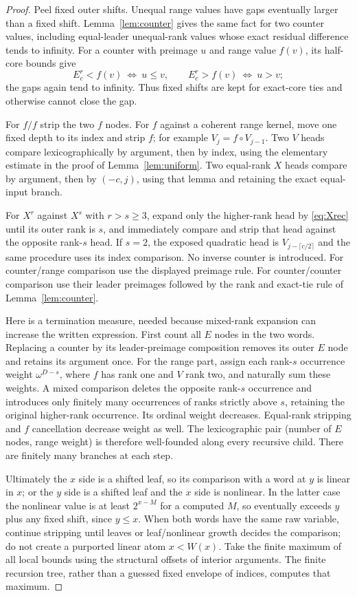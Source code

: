 \documentclass[11pt]{article}
\begin{document}
\begin{proof}
Peel fixed outer shifts. Unequal range values have gaps eventually larger
than a fixed shift. Lemma~\ref{lem:counter} gives the same fact for two
counter values, including equal-leader unequal-rank values whose exact
residual difference tends to infinity. For a counter with preimage $u$
and range value $f(v)$, its half-core bounds give
\[
 E^r_c<f(v)\ \Longleftrightarrow\ u\le v,
 \qquad E^r_c>f(v)\ \Longleftrightarrow\ u>v;
\]
the gaps again tend to infinity. Thus fixed shifts are kept for exact-core
ties and otherwise cannot close the gap.

For $f/f$ strip the two $f$ nodes. For $f$ against a coherent range
kernel, move one fixed depth to its index and strip $f$; for example
$V_j=f\circ V_{j-1}$. Two $V$ heads compare lexicographically by argument,
then by index, using the elementary estimate in the proof of
Lemma~\ref{lem:uniform}. Two equal-rank $X$ heads compare by argument,
then by $(-c,j)$, using that lemma and retaining the exact equal-input
branch.

For $X^r$ against $X^s$ with $r>s\ge3$, expand only the higher-rank head
by \eqref{eq:Xrec} until its outer rank is $s$, and immediately compare
and strip that head against the opposite rank-$s$ head. If $s=2$,
the exposed quadratic head is $V_{j-\lceil c/2\rceil}$ and the same
procedure uses its index comparison. No inverse counter is introduced.
For counter/range comparison use the displayed preimage rule. For
counter/counter comparison use their leader preimages followed by the
rank and exact-tie rule of Lemma~\ref{lem:counter}.

Here is a termination measure, needed because mixed-rank expansion can
increase the written expression. First count all $E$ nodes in the two
words. Replacing a counter by its leader-preimage composition removes
its outer $E$ node and retains its argument once. For the range part,
assign each rank-$s$ occurrence weight $\omega^{D-s}$, where $f$ has
rank one and $V$ rank two, and naturally sum these weights. A mixed
comparison deletes the opposite rank-$s$ occurrence and introduces only
finitely many occurrences of ranks strictly above $s$, retaining the
original higher-rank occurrence. Its ordinal weight decreases. Equal-rank
stripping and $f$ cancellation decrease weight as well. The lexicographic
pair (number of $E$ nodes, range weight) is therefore well-founded along
every recursive child. There are finitely many branches at each step.

Ultimately the $x$ side is a shifted leaf, so its comparison with a word
at $y$ is linear in $x$; or the $y$ side is a shifted leaf and the $x$
side is nonlinear. In the latter case the nonlinear value is at least
$2^{x-M}$ for a computed $M$, so eventually exceeds $y$ plus any fixed
shift, since $y\le x$. When both words have the same raw variable,
continue stripping until leaves or leaf/nonlinear growth decides the
comparison; do not create a purported linear atom $x<W(x)$.
Take the finite maximum of all local bounds using the structural offsets
of interior arguments. The finite recursion tree, rather than a guessed
fixed envelope of indices, computes that maximum.
\end{proof}
\end{document}
